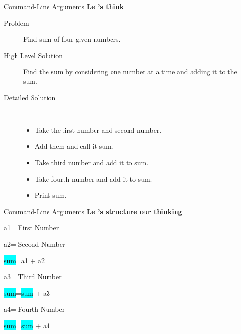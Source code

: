 \documentclass[12pt]{beamer}
\begin{document}
\begin{frame}{Command-Line Arguments}
 \textbf{Let's think}
 \begin{description}
  \item [Problem] Find sum of four given numbers.
  \item [High Level  Solution] Find the sum by considering one number at a time and adding it to the sum.
  \item [Detailed Solution]\
  \begin{itemize}
   \item Take the first number and second number. 
   \item Add them and call it sum.
   \item Take third number and add it to sum.
   \item Take fourth number and add it to sum.
   \item Print sum. 
  \end{itemize}
 \end{description}
\end{frame}

\begin{frame}{Command-Line Arguments}
 \textbf{Let's structure our thinking}
 
 \vspace{1pc}
\hspace{1cm}a1\hspace{1cm}=\hspace{.3cm} First Number

\hspace{1cm}a2\hspace{1cm}=\hspace{.3cm} Second Number

\hspace{0.6cm}\colorbox{cyan}{sum}\hspace{.75cm}=\hspace{.42cm}a1 + a2

\hspace{1cm}a3\hspace{1cm}=\hspace{.3cm} Third Number

\hspace{0.6cm}\colorbox{cyan}{sum}\hspace{.75cm}=\hspace{.42cm}\colorbox{cyan}{sum} + a3

\hspace{1cm}a4\hspace{1cm}=\hspace{.3cm} Fourth Number

\hspace{0.6cm}\colorbox{cyan}{sum}\hspace{.75cm}=\hspace{.42cm}\colorbox{cyan}{sum} + a4

\vspace{1pc}
\hspace{3.3cm}
\end{frame}
\end{document}

